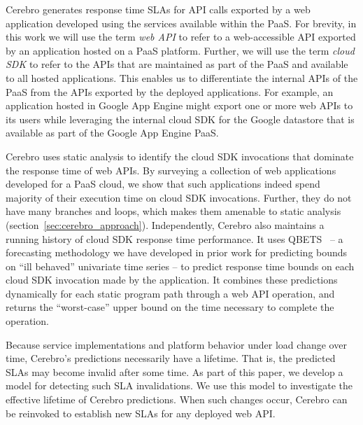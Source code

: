 Cerebro generates response time SLAs for API calls exported by a web
application
developed using the services available within the PaaS.  For brevity, in this work
we will use the
term \textit{web API} to refer to a web-accessible API exported by an
application hosted on a PaaS platform. Further, 
we will use the term \textit{cloud
SDK} to refer to the APIs that are maintained as part of the PaaS and
available to all hosted applications. This enables us to
differentiate the internal APIs of the PaaS from the 
APIs exported by the deployed applications.   
For example, an application hosted in Google App Engine might export one or
more web APIs to its users while leveraging the internal cloud SDK for the
Google datastore that is available as part of the Google App Engine PaaS.

Cerebro uses static analysis to identify the cloud SDK invocations
that dominate the response time of web APIs. By surveying a collection of
web applications developed for a PaaS cloud, we show
that such applications indeed spend majority of their execution time on cloud SDK
invocations. Further, they do not have many branches and loops, which
makes them amenable to static analysis (section~\ref{sec:cerebro_approach}). Independently,
Cerebro also maintains a running history of cloud SDK response time 
performance.  It uses
QBETS~\cite{Nurmi:2007:QQB:1791551.1791556} -- a forecasting methodology
we have developed in prior work for predicting bounds on ``ill behaved''
univariate time series -- to predict response time bounds on each cloud SDK
invocation made by the application.  It combines these predictions dynamically
for each static program path through a web API operation,
and returns the ``worst-case''
upper bound on the time necessary to 
complete the operation.


Because service implementations and platform behavior under load change over time,
Cerebro's predictions necessarily have a lifetime. That is, the predicted SLAs may
become invalid after some time.  
As part of this paper, we develop a model for detecting such SLA invalidations. 
We use this model to investigate
the effective lifetime of Cerebro predictions. When such changes occur,
Cerebro can be reinvoked to establish new SLAs for any deployed web API.  %


